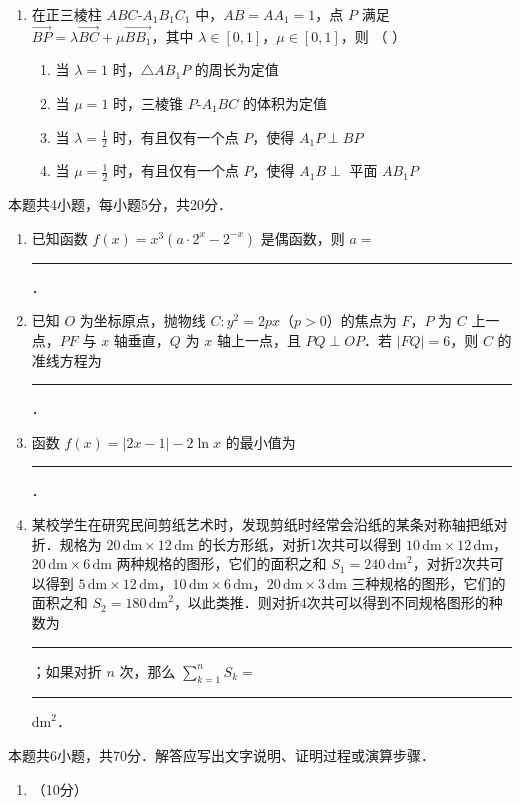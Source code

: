 \begin{description}
\begin{enumerate}[leftmargin=5pt]
        \item 在正三棱柱 $ABC$-$A_{1}B_{1}C_{1}$ 中，$AB=AA_{1}=1$，点 $P$ 满足 $\overrightarrow{BP}=\lambda\overrightarrow{BC}+\mu\overrightarrow{BB_{1}}$，其中 $\lambda\in[0,1]$，$\mu\in[0,1]$，则 （ ）
        \begin{enumerate}[label=\Alph*.]
            \item 当 $\lambda=1$ 时，$\triangle AB_{1}P$ 的周长为定值
            \item 当 $\mu=1$ 时，三棱锥 $P$-$A_{1}BC$ 的体积为定值
            \item 当 $\lambda=\frac{1}{2}$ 时，有且仅有一个点 $P$，使得 $A_{1}P\perp BP$
            \item 当 $\mu=\frac{1}{2}$ 时，有且仅有一个点 $P$，使得 $A_{1}B\perp$ 平面 $AB_{1}P$
        \end{enumerate}
    \end{enumerate}

    \item[三、填空题] 本题共4小题，每小题5分，共20分．
    \begin{enumerate}[leftmargin=5pt]
      \addtocounter{enumi}{+12}
        \item 已知函数 $f(x)=x^{3}(a\cdot2^{x}-2^{-x})$ 是偶函数，则 $a=$ \rule[-0.3ex]{3em}{0.4pt}．
        \item 已知 $O$ 为坐标原点，抛物线 $C:y^{2}=2px$（$p>0$）的焦点为 $F$，$P$ 为 $C$ 上一点，$PF$ 与 $x$ 轴垂直，$Q$ 为 $x$ 轴上一点，且 $PQ\perp OP$．若 $|FQ|=6$，则 $C$ 的准线方程为 \rule[-0.3ex]{3em}{0.4pt}．
        \item 函数 $f(x)=|2x-1|-2\ln x$ 的最小值为 \rule[-0.3ex]{3em}{0.4pt}．
        \item 某校学生在研究民间剪纸艺术时，发现剪纸时经常会沿纸的某条对称轴把纸对折．规格为 $20\,\text{dm}\times 12\,\text{dm}$ 的长方形纸，对折1次共可以得到 $10\,\text{dm}\times 12\,\text{dm}$，$20\,\text{dm}\times 6\,\text{dm}$ 两种规格的图形，它们的面积之和 $S_{1}=240\,\text{dm}^{2}$，对折2次共可以得到 $5\,\text{dm}\times 12\,\text{dm}$，$10\,\text{dm}\times 6\,\text{dm}$，$20\,\text{dm}\times 3\,\text{dm}$ 三种规格的图形，它们的面积之和 $S_{2}=180\,\text{dm}^{2}$，以此类推．则对折4次共可以得到不同规格图形的种数为 \rule[-0.3ex]{3em}{0.4pt}；如果对折 $n$ 次，那么 $\displaystyle\sum_{k=1}^{n}S_{k}=$ \rule[-0.3ex]{3em}{0.4pt} $\text{dm}^{2}$．
    \end{enumerate}

    \item[四、解答题] 本题共6小题，共70分．解答应写出文字说明、证明过程或演算步骤．
    \begin{enumerate}[leftmargin=5pt]
      \addtocounter{enumi}{+16}
        \item （10分）


\end{enumerate}
\end{description}
